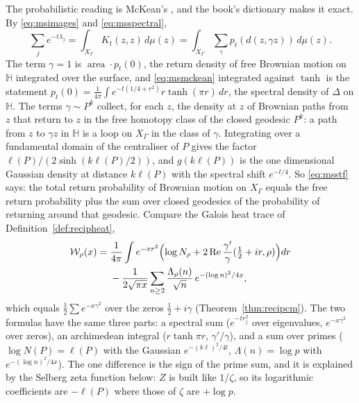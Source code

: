 The probabilistic reading is McKean's \cite{mckean1972}, and the book's dictionary makes it exact. By \eqref{eq:msimages} and \eqref{eq:msspectral},
\[
\sum_je^{-t\lambda_j}=\int_{X_\Gamma}K_t(z,z)\,d\mu(z)=\int_{X_\Gamma}\sum_\gamma p_t(d(z,\gamma z))\,d\mu(z).
\] The term $\gamma=1$ is $\operatorname{area}\cdot p_t(0)$, the return density of free Brownian motion on $\mathbb H$ integrated over the surface, and \eqref{eq:msmckean} integrated against $\tanh$ is the statement $p_t(0)=\frac1{4\pi}\int e^{-t(1/4+r^2)}r\tanh(\pi r)\,dr$, the spectral density of $\Delta$ on $\mathbb H$. The terms $\gamma\sim P^k$ collect, for each $z$, the density at $z$ of Brownian paths from $z$ that return to $z$ in the free homotopy class of the closed geodesic $P^k$: a path from $z$ to $\gamma z$ in $\mathbb H$ is a loop on $X_\Gamma$ in the class of $\gamma$. Integrating over a fundamental domain of the centraliser of $P$ gives the factor $\ell(P)/(2\sinh(k\ell(P)/2))$, and $g(k\ell(P))$ is the one dimensional Gaussian density at distance $k\ell(P)$ with the spectral shift $e^{-t/4}$. So \eqref{eq:msstf} says: the total return probability of Brownian motion on $X_\Gamma$ equals the free return probability plus the sum over closed geodesics of the probability of returning around that geodesic. Compare the Galois heat trace of Definition~\ref{def:recipheat},
\[
\begin{split}
\mathcal W_\rho(x)={}&\frac1{4\pi}\int e^{-xr^2}\Bigl(\log N_\rho+2\operatorname{Re}\frac{\gamma'}\gamma(\tfrac12+ir,\rho)\Bigr)dr\\
&-\frac1{2\sqrt{\pi x}}\sum_{n\ge2}\frac{\Lambda_\rho(n)}{\sqrt n}\,e^{-(\log n)^2/4x},
\end{split}
\]
which equals $\frac12\sum e^{-x\gamma^2}$ over the zeros $\frac12+i\gamma$ (Theorem~\ref{thm:recipcm}). The two formulas have the same three parts: a spectral sum ($e^{-tr_j^2}$ over eigenvalues, $e^{-x\gamma^2}$ over zeros), an archimedean integral ($r\tanh\pi r$, $\gamma'/\gamma$), and a sum over primes ($\log N(P)=\ell(P)$ with the Gaussian $e^{-(k\ell)^2/4t}$, $\Lambda(n)=\log p$ with $e^{-(\log n)^2/4x}$). The one difference is the sign of the prime sum, and it is explained by the Selberg zeta function below: $Z$ is built like $1/\zeta$, so its logarithmic coefficients are $-\ell(P)$ where those of $\zeta$ are $+\log p$.

